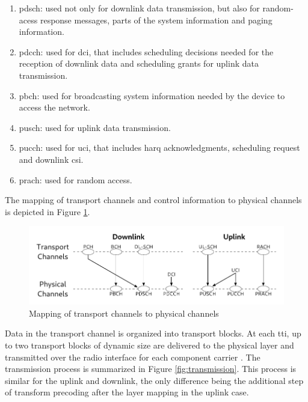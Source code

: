 \begin{enumerate}
    \item \Gls{pdsch}: used not only for downlink data transmission, but also for random-acess response messages, parts of the system information and paging information.
    \item \Gls{pdcch}: used for \gls{dci}, that includes scheduling decisions needed for the reception of downlink data and scheduling grants for uplink data transmission.
    \item \Gls{pbch}: used for broadcasting system information needed by the device to access the network.
    \item \Gls{pusch}: used for uplink data transmission.
    \item \Gls{pucch}: used for \gls{uci}, that includes \gls{harq} acknowledgments, scheduling request and downlink \gls{csi}.
    \item \Gls{prach}: used for random access.
\end{enumerate}

The mapping of transport channels and control information to physical channels is depicted in Figure \ref{fig:channel-mapping}.

\begin{figure}[htbp]
    \centerline{\includegraphics[width=\columnwidth]{figures/chp_theory/complete.pdf}}
    \caption{Mapping of transport channels to physical channels}
    \label{fig:channel-mapping}
\end{figure}


Data in the transport channel is organized into transport blocks. At each \gls{tti}, up to two transport blocks of dynamic size are delivered to the physical layer and transmitted over the radio interface for each component carrier \cite{ErikDahlman5G}.
%
The transmission process is summarized in Figure \ref{fig:transmission}.
%
This process is similar for the uplink and downlink, the only difference being the additional step of transform precoding after the layer mapping in the uplink case.

